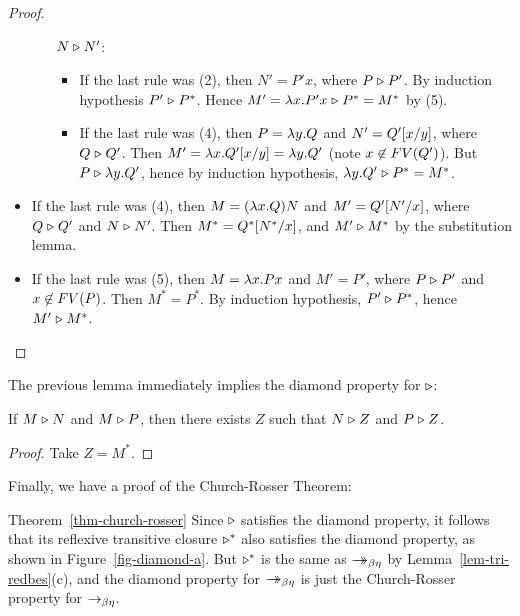 \documentclass{article}
\begin{document}
\begin{proof}
\begin{itemize}
\begin{itemize}
      $N\mathrel{\triangleright} N'$:
      \begin{itemize}
      \item If the last rule was (2), then $N' = P'x$, where $P\mathrel{\triangleright}
        P'$. By induction hypothesis $P' \mathrel{\triangleright} P^*$.  Hence $M' = \lambda
        x.P'x \mathrel{\triangleright} P^* = M^*$ by (5).
      \item If the last rule was (4), then $P = \lambda y.Q$ and $N' =
        Q'[x/y]$, where $Q\mathrel{\triangleright} Q'$. Then $M' = \lambda
        x.Q'[x/y] = \lambda y.Q'$ (note $x \not\in FV(Q')$).
        But $P \mathrel{\triangleright} \lambda y.Q'$, hence by induction hypothesis, $\lambda
        y.Q' \mathrel{\triangleright} P^* = M^*$.
      \end{itemize}
    \end{itemize}
  \item If the last rule was (4), then $M = (\lambda x.Q)N$ and $M' =
    Q'[N'/x]$, where $Q\mathrel{\triangleright} Q'$ and $N\mathrel{\triangleright} N'$. Then $M^* =
    Q^*[N^*/x]$, and $M' \mathrel{\triangleright} M^*$ by the substitution lemma.
  \item If the last rule was (5), then $M = \lambda x.Px$ and $M' = P'$,
    where $P\mathrel{\triangleright} P'$ and $x\not\in FV(P)$. Then $M^*=P^*$. By
    induction hypothesis, $P'\mathrel{\triangleright} P^*$, hence $M'\mathrel{\triangleright} M^*$.  \eot
  \end{itemize}
\end{proof}

The previous lemma immediately implies the diamond property for
$\mathrel{\triangleright}$:

\begin{lemma}
  If $M\mathrel{\triangleright} N$ and $M\mathrel{\triangleright} P$, then there exists $Z$ such that $N\mathrel{\triangleright}
  Z$ and $P\mathrel{\triangleright} Z$. 
\end{lemma}

\begin{proof}
  Take $Z=M^*$.\eot
\end{proof}

Finally, we have a proof of the Church-Rosser Theorem:

\begin{proofof}{Theorem~\ref{thm-church-rosser}}
  Since $\mathrel{\triangleright}$ satisfies the diamond property, it follows that its
  reflexive transitive closure $\mathrel{\triangleright}^*$ also satisfies the diamond
  property, as shown in Figure~\ref{fig-diamond-a}. But $\mathrel{\triangleright}^*$ is the same
  as $\mathrel{\rightarrow\!\!\!\!\!\rightarrow}_{\beta\eta}$ by Lemma~\ref{lem-tri-redbes}(c), and the diamond property for
  $\mathrel{\rightarrow\!\!\!\!\!\rightarrow}_{\beta\eta}$ is just the Church-Rosser property for $\rightarrow_{\beta\eta}$.\eot
\end{proofof}

\end{document}
